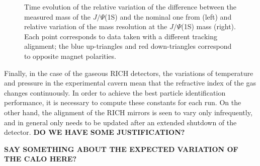 \begin{figure}[h]
\begin{minipage}{0.5\columnwidth}
\end{minipage} 
\caption{\label{fig:trackerStability} Time evolution of  the relative variation of the difference
  between the measured mass of the $J/\Psi$(1S) and the nominal one from
  \cite{PDG} (left) and relative variation of the mass resolution at the
  $J/\Psi$(1S) mass (right). Each point corresponds to data taken with a
  different tracking alignment; the blue up-triangles and red down-triangles correspond to opposite magnet polarities.}
\end{figure}

Finally, in the case of the gaseous RICH detectors, the variations of temperature
and pressure in the experimental cavern mean that the refractive index of the gas
changes continuously. In order to achieve the best particle identification performance, it 
is necessary to compute these constants for each run. On the other hand, the alignment
of the RICH mirrors is seen to vary only infrequently, and in general only needs to be updated
after an extended shutdown of the detector. \textbf{DO WE HAVE SOME JUSTIFICATION?}

\textbf{SAY SOMETHING ABOUT THE EXPECTED VARIATION OF THE CALO HERE?}
